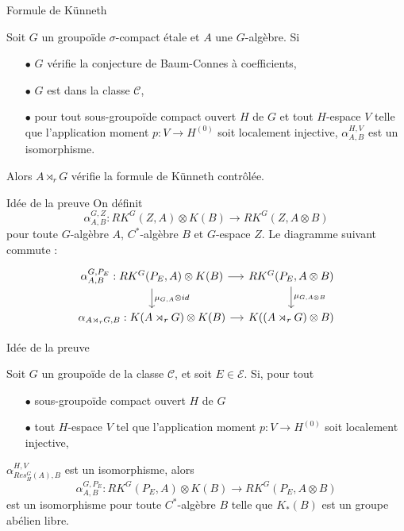 \begin{frame}{Formule de Künneth}
\begin{thmfr}
Soit $G$ un groupoïde $\sigma$-compact étale et $A$ une $G$-algèbre. Si 
\begin{itemize}
\item[$\bullet$] $G$ vérifie la conjecture de Baum-Connes à coefficients,
\item[$\bullet$] $G$ est dans la classe $\mathcal C$,
\item[$\bullet$] pour tout sous-groupoïde compact ouvert $H$ de $G$ et tout $H$-espace $V$ telle que l'application moment $p : V\rightarrow H^{(0)}$ soit localement injective, $\alpha_{A,B}^{H,V}$ est un isomorphisme.
\end{itemize} 
Alors $A\rtimes_r G$ vérifie la formule de Künneth contrôlée.
\end{thmfr}
\end{frame}

\begin{frame}{Idée de la preuve}
On définit  
\[\alpha_{A,B}^{G,Z} : RK^G(Z,A)\otimes K(B) \rightarrow RK^G(Z,A\otimes B)\]
pour toute $G$-algèbre $A$, $C^*$-algèbre $B$ et $G$-espace $Z$.
Le diagramme suivant commute :
\[\begin{tikzcd}[ampersand replacement=\&, column sep=small] 
\alpha_{A,B}^{G,P_E}: RK^G(P_E,A)\otimes K(B)\arrow{r}\arrow{d}{\mu_{G,A}\otimes id}    \& RK^G(P_E,A\otimes B)\arrow{d}{\mu_{G,A\otimes B}} \\
\alpha_{A\rtimes_r G,B}: K(A\rtimes_r G) \otimes K(B) \arrow{r} \& K((A\rtimes_r G)\otimes B)
\end{tikzcd}\]
\end{frame}

\begin{frame}{Idée de la preuve}
\begin{thmfr}
Soit $G$ un groupoïde de la classe $\mathcal C$, et soit $E\in\mathcal E$. Si, pour tout 
\begin{itemize}
\item[$\bullet$] sous-groupoïde compact ouvert $H$ de $G$
\item[$\bullet$] tout $H$-espace $V$ tel que l'application moment $p : V\rightarrow H^{(0)}$ soit localement injective,
\end{itemize} 
$\alpha_{Res_H^G(A),B}^{H,V}$ est un isomorphisme, alors 
\[\alpha_{A,B}^{G,P_E}: RK^G(P_E,A)\otimes K(B)\rightarrow RK^G(P_E,A\otimes B) \] 
est un isomorphisme pour toute $C^*$-algèbre $B$ telle que $K_*(B)$ est un groupe abélien libre.\\
\end{thmfr}
\end{frame}

